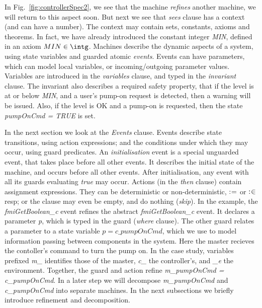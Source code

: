 \documentclass{llncs}%
\begin{document}
 In Fig.~\ref{fig:controllerSpec2}, we see that the machine \emph{refines} another machine, we will return to this aspect soon. But next we see that  \emph{sees} clause has a context (and can have a number). The context may contain sets, constants, axioms and theorems. In fact, we have already introduced the constant integer \emph{MIN}, defined in an axiom $MIN \in \intg$. Machines describe the dynamic aspects of a system, using state variables and guarded atomic \emph{events}. Events can have parameters, which can model local variables, or incoming/outgoing parameter values. Variables are introduced in the \emph{variables} clause, and typed in the \emph{invariant} clause. The invariant also describes a required safety property, that if the level is at or below \emph{MIN}, and a user's pump-on request is detected, then a warning will be issued. Also, if the level is OK and a pump-on is requested, then the state \emph{pumpOnCmd = TRUE} is  set. 

In the next section we look at the \emph{Events} clause. Events describe state transitions, using action expressions; and the conditions under which they may occur, using guard predicates. An \emph{initialisation} event is a special unguarded event, that takes place before all other events. It describes the initial state of the machine, and occurs before all other events. After initialisation, any event with all its guards evaluating \emph{true} may occur. Actions (in the \emph{then} clause) contain assignment expressions. They can be deterministic or non-deterministic, $\mathrel{:\mkern1mu=}$ or $\mathrel{:\mkern1mu\in}$ resp; or the clause may even be empty, and do nothing (\emph{skip}). In the example, the \emph{fmiGetBoolean\_c} event refines the abstract \emph{fmiGetBoolean\_c} event. It declares a parameter \emph{p}, which is typed in the guard (\emph{where} clause). The other guard relates a parameter to a state variable $p = c\_pumpOnCmd$, which we use to model information passing between components in the system. Here the master recieves the contoller's command to turn the pump on. In the case study, variables prefixed \emph{m\_} identifies those of the master, \emph{c\_} the controller's, and \emph{\_e} the environment. Together, the guard and action refine \emph{m\_pumpOnCmd = c\_pumpOnCmd}. In a later step we will decompose \emph{m\_pumpOnCmd} and \emph{c\_pumpOnCmd} into separate machines. In the next subsections we briefly introduce refinement and decomposition.
\end{document}
